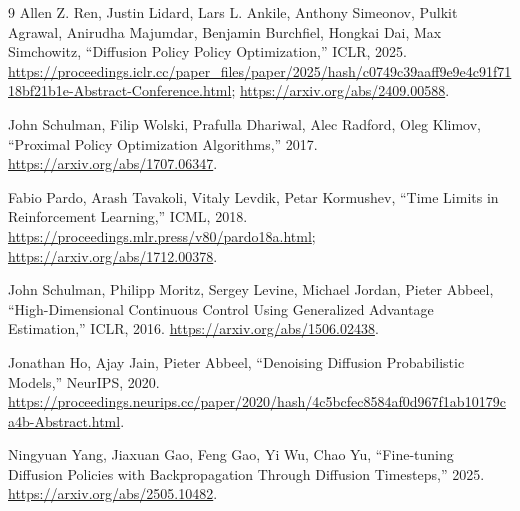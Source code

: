 \documentclass[a4paper,11pt]{article}
\begin{document}
\begin{thebibliography}{9}
Allen Z. Ren, Justin Lidard, Lars L. Ankile, Anthony Simeonov, Pulkit Agrawal,
Anirudha Majumdar, Benjamin Burchfiel, Hongkai Dai, Max Simchowitz,
``Diffusion Policy Policy Optimization,'' ICLR, 2025.
\url{https://proceedings.iclr.cc/paper_files/paper/2025/hash/c0749c39aaff9e9e4c91f7118bf21b1e-Abstract-Conference.html};
\url{https://arxiv.org/abs/2409.00588}.

John Schulman, Filip Wolski, Prafulla Dhariwal, Alec Radford, Oleg Klimov,
``Proximal Policy Optimization Algorithms,'' 2017.
\url{https://arxiv.org/abs/1707.06347}.

Fabio Pardo, Arash Tavakoli, Vitaly Levdik, Petar Kormushev,
``Time Limits in Reinforcement Learning,'' ICML, 2018.
\url{https://proceedings.mlr.press/v80/pardo18a.html};
\url{https://arxiv.org/abs/1712.00378}.

John Schulman, Philipp Moritz, Sergey Levine, Michael Jordan, Pieter Abbeel,
``High-Dimensional Continuous Control Using Generalized Advantage Estimation,''
ICLR, 2016. \url{https://arxiv.org/abs/1506.02438}.

Jonathan Ho, Ajay Jain, Pieter Abbeel,
``Denoising Diffusion Probabilistic Models,'' NeurIPS, 2020.
\url{https://proceedings.neurips.cc/paper/2020/hash/4c5bcfec8584af0d967f1ab10179ca4b-Abstract.html}.

Ningyuan Yang, Jiaxuan Gao, Feng Gao, Yi Wu, Chao Yu,
``Fine-tuning Diffusion Policies with Backpropagation Through Diffusion Timesteps,'' 2025.
\url{https://arxiv.org/abs/2505.10482}.
\end{thebibliography}
\end{document}
